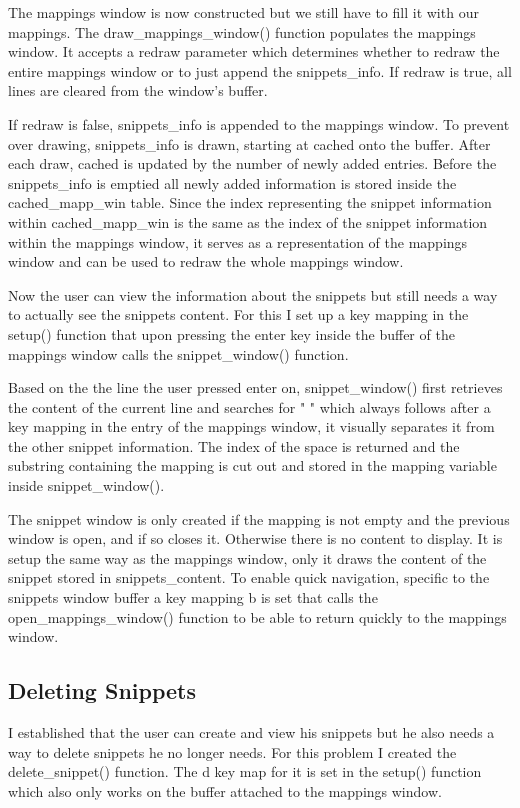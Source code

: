 \documentclass[runningheads]{llncs}
\begin{document}
The mappings window is now constructed but we still have to fill it with our mappings.
The draw\_mappings\_window() function populates the mappings window.
It accepts a redraw parameter which determines whether to redraw the entire mappings window or to just append the snippets\_info. 
If redraw is true, all lines are cleared from the window's buffer.

If redraw is false, snippets\_info is appended to the mappings window.
To prevent over drawing, snippets\_info is drawn, starting at cached onto the buffer.
After each draw, cached is updated by the number of newly added entries. Before the snippets\_info is emptied all newly added information is stored
inside the cached\_mapp\_win table. Since the index representing the snippet information within cached\_mapp\_win is the same as the index of the snippet
information within the mappings window, it serves as a representation of the mappings window and can be used to redraw the whole mappings window.

Now the user can view the information about the snippets but still needs a way to actually see the snippets content. For this I set up a key mapping in 
the setup() function that upon pressing the enter key inside the buffer of the mappings window calls the snippet\_window() function. 

Based on the the line the user pressed enter on, snippet\_window() first retrieves the content of the current line and searches for " " which always 
follows after a key mapping in the entry of the mappings window, it visually separates it from the other snippet information. 
The index of the space is returned and the substring containing the mapping is cut out and stored in the mapping variable inside snippet\_window().

The snippet window is only created if the mapping is not empty and the previous window is open, and if so closes it. Otherwise there is no content to display.
It is setup the same way as the mappings window, only it draws the content of the snippet stored in snippets\_content. 
To enable quick navigation, specific to the snippets window buffer a key mapping b is set that calls the open\_mappings\_window() function
to be able to return quickly to the mappings window.

\subsection{Deleting Snippets}

I established that the user can create and view his snippets but he also needs a way to delete snippets he no longer needs. 
For this problem I created the delete\_snippet() function. The d key map for it is set in the setup()
function which also only works on the buffer attached to the mappings window.
\end{document}
